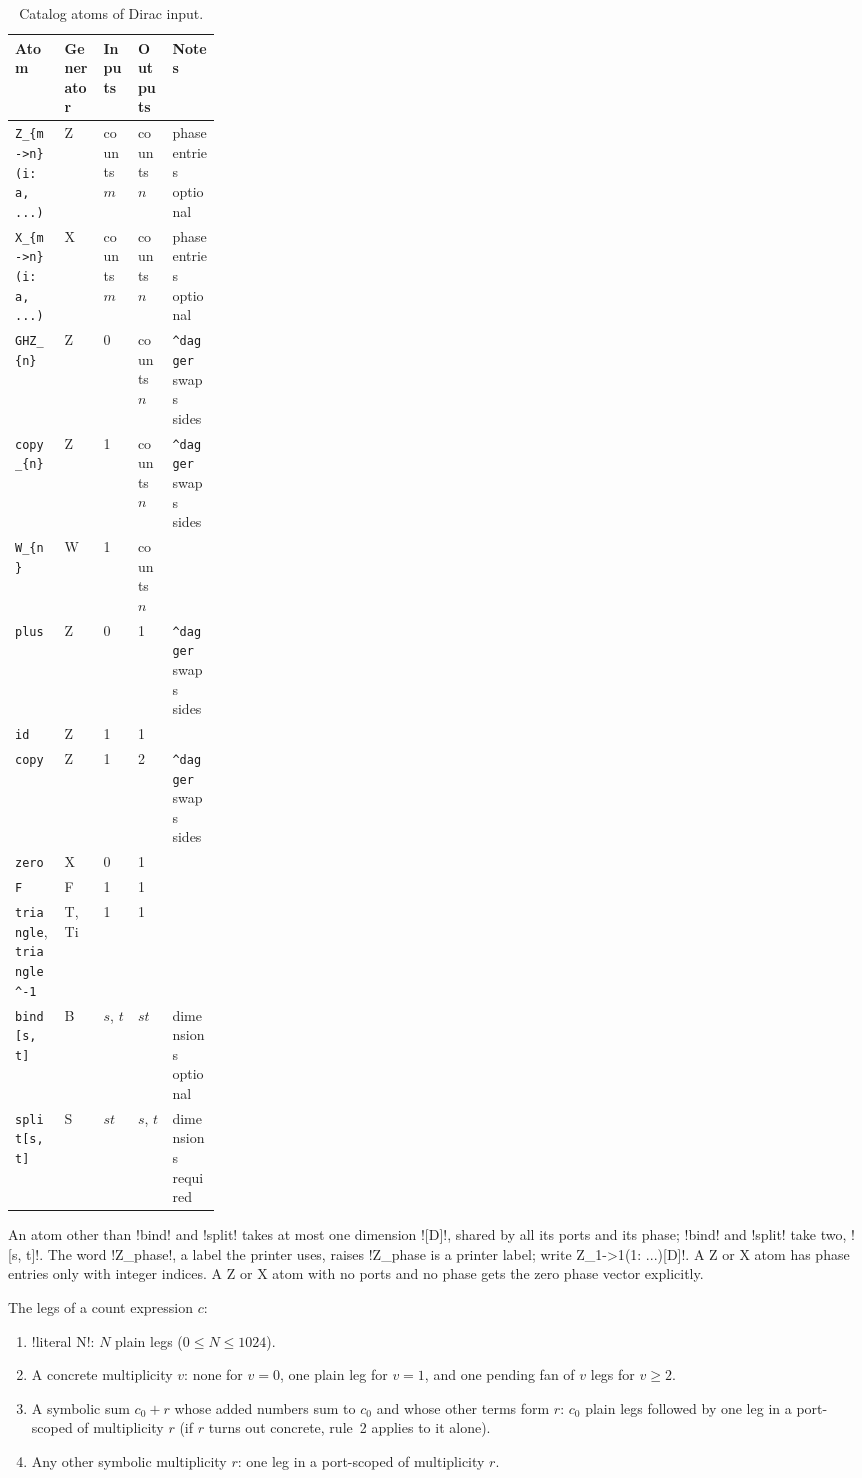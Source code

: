 \begin{table}[H]
\centering\small
\begin{tabularx}{\linewidth}{@{}>{\raggedright\arraybackslash}p{0.24\linewidth}lll>{\raggedright\arraybackslash}X@{}}
\toprule
Atom & Generator & Inputs & Outputs & Notes \\
\midrule
\texttt{Z\_\{m->n\}(i: a, ...)} & Z & counts $m$ & counts $n$ & phase entries optional \\
\texttt{X\_\{m->n\}(i: a, ...)} & X & counts $m$ & counts $n$ & phase entries optional \\
\texttt{GHZ\_\{n\}} & Z & 0 & counts $n$ & \texttt{\^{}dagger} swaps sides \\
\texttt{copy\_\{n\}} & Z & 1 & counts $n$ & \texttt{\^{}dagger} swaps sides \\
\texttt{W\_\{n\}} & W & 1 & counts $n$ & \\
\texttt{plus} & Z & 0 & 1 & \texttt{\^{}dagger} swaps sides \\
\texttt{id} & Z & 1 & 1 & \\
\texttt{copy} & Z & 1 & 2 & \texttt{\^{}dagger} swaps sides \\
\texttt{zero} & X & 0 & 1 & \\
\texttt{F} & F & 1 & 1 & \\
\texttt{triangle}, \texttt{triangle\^{}-1} & T, Ti & 1 & 1 & \\
\texttt{bind[s, t]} & B & $s$, $t$ & $st$ & dimensions optional \\
\texttt{split[s, t]} & S & $st$ & $s$, $t$ & dimensions required \\
\bottomrule
\end{tabularx}
\caption{Catalog atoms of Dirac input.}
\label{tab:language-atoms}
\end{table}

An atom other than \code!bind! and \code!split! takes at most one dimension \code![D]!, shared by all its ports and its phase; \code!bind! and \code!split! take two, \code![s, t]!. The word \code!Z_phase!, a label the printer uses, raises \code!Z_phase is a printer label; write Z_{1->1}(1: ...)[D]!. A Z or X atom has phase entries only with integer indices. A Z or X atom with no ports and no phase gets the zero phase vector explicitly.

\begin{algorithm}\label{alg:language-counts}
\leavevmode
The legs of a count expression $c$:
\begin{enumerate}
\item \code!literal N!: $N$ plain legs ($0\le N\le1024$).
\item A concrete multiplicity $v$: none for $v=0$, one plain leg for $v=1$, and one pending fan of $v$ legs for $v\ge2$.
\item A symbolic sum $c_0+r$ whose added numbers sum to $c_0$ and whose other terms form $r$: $c_0$ plain legs followed by one leg in a port-scoped \bbox{} of multiplicity $r$ (if $r$ turns out concrete, rule~2 applies to it alone).
\item Any other symbolic multiplicity $r$: one leg in a port-scoped \bbox{} of multiplicity $r$.
\end{enumerate}
\end{algorithm}


